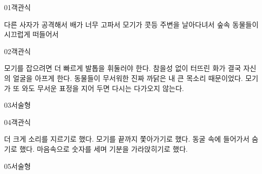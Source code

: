\documentclass[fs12,seriesSau]{korfarm-base}
\begin{document}
\begin{kfQBlock}{01}{객관식}
\begin{kfChoices}
\kfChoice 다른 사자가 공격해서
\kfChoice 배가 너무 고파서
\kfChoice 모기가 콧등 주변을 날아다녀서
\kfChoice 숲속 동물들이 시끄럽게 떠들어서
\end{kfChoices}
\end{kfQBlock}
\begin{kfQBlock}{02}{객관식}
\begin{kfChoices}
\kfChoice 모기를 잡으려면 더 빠르게 발톱을 휘둘러야 한다.
\kfChoice 참을성 없이 터뜨린 화가 결국 자신의 얼굴을 아프게 한다.
\kfChoice 동물들이 무서워한 진짜 까닭은 내 큰 목소리 때문이었다.
\kfChoice 모기가 또 와도 무서운 표정을 지어 두면 다시는 다가오지 않는다.
\end{kfChoices}
\end{kfQBlock}
\begin{kfQBlock}{03}{서술형}
\end{kfQBlock}
\begin{kfQBlock}{04}{객관식}
\begin{kfChoices}
\kfChoice 더 크게 소리를 지르기로 했다.
\kfChoice 모기를 끝까지 쫓아가기로 했다.
\kfChoice 동굴 속에 들어가서 숨기로 했다.
\kfChoice 마음속으로 숫자를 세며 기분을 가라앉히기로 했다.
\end{kfChoices}
\end{kfQBlock}
\begin{kfQBlock}{05}{서술형}
\end{kfQBlock}


\end{document}
